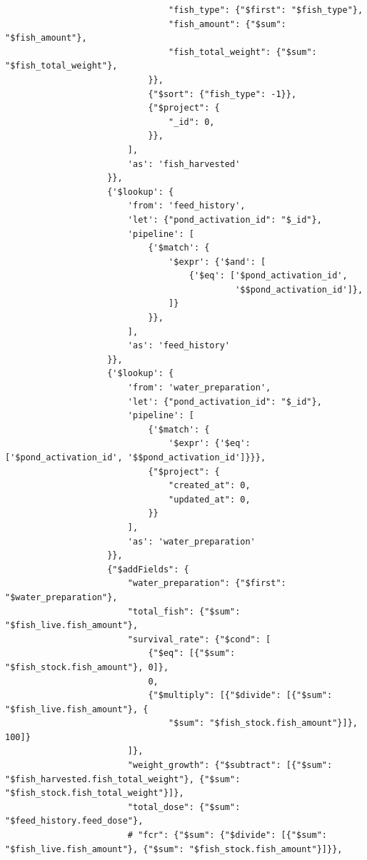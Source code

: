 \begin{enumerate}[1.]
\begin{lstlisting}
                                "fish_type": {"$first": "$fish_type"},
                                "fish_amount": {"$sum": "$fish_amount"},
                                "fish_total_weight": {"$sum": "$fish_total_weight"},
                            }},
                            {"$sort": {"fish_type": -1}},
                            {"$project": {
                                "_id": 0,
                            }},
                        ],
                        'as': 'fish_harvested'
                    }},
                    {'$lookup': {
                        'from': 'feed_history',
                        'let': {"pond_activation_id": "$_id"},
                        'pipeline': [
                            {'$match': {
                                '$expr': {'$and': [
                                    {'$eq': ['$pond_activation_id',
                                             '$$pond_activation_id']},
                                ]}
                            }},
                        ],
                        'as': 'feed_history'
                    }},
                    {'$lookup': {
                        'from': 'water_preparation',
                        'let': {"pond_activation_id": "$_id"},
                        'pipeline': [
                            {'$match': {
                                '$expr': {'$eq': ['$pond_activation_id', '$$pond_activation_id']}}},
                            {"$project": {
                                "created_at": 0,
                                "updated_at": 0,
                            }}
                        ],
                        'as': 'water_preparation'
                    }},
                    {"$addFields": {
                        "water_preparation": {"$first": "$water_preparation"},
                        "total_fish": {"$sum": "$fish_live.fish_amount"},
                        "survival_rate": {"$cond": [
                            {"$eq": [{"$sum": "$fish_stock.fish_amount"}, 0]},
                            0,
                            {"$multiply": [{"$divide": [{"$sum": "$fish_live.fish_amount"}, {
                                "$sum": "$fish_stock.fish_amount"}]}, 100]}
                        ]},
                        "weight_growth": {"$subtract": [{"$sum": "$fish_harvested.fish_total_weight"}, {"$sum": "$fish_stock.fish_total_weight"}]},
                        "total_dose": {"$sum": "$feed_history.feed_dose"},
                        # "fcr": {"$sum": {"$divide": [{"$sum": "$fish_live.fish_amount"}, {"$sum": "$fish_stock.fish_amount"}]}},

\end{lstlisting}
\end{enumerate}
